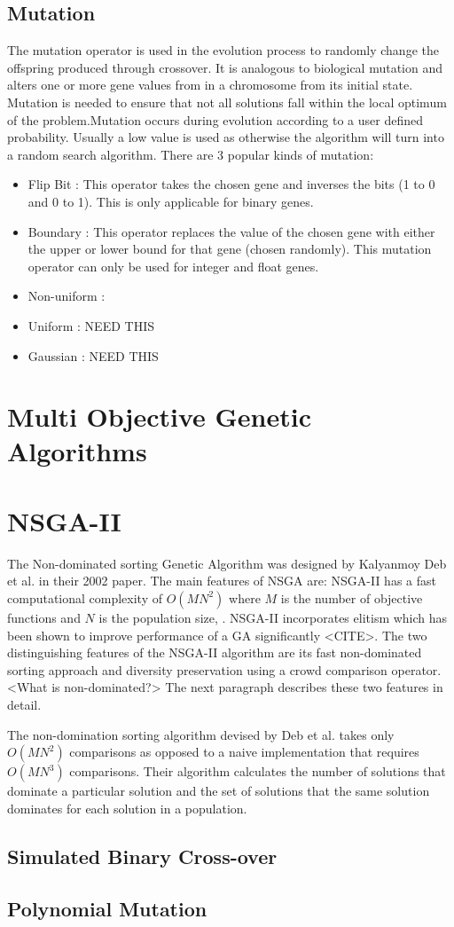 \subsection{Mutation}
The mutation operator is used in the evolution process to randomly change the offspring produced through crossover. It is analogous to biological mutation and alters one or more gene values from in a chromosome from its initial state. Mutation is needed to ensure that not all solutions fall within the local optimum of the problem.Mutation occurs during evolution according to a user defined probability. Usually a low value is used as otherwise the algorithm will turn into a random search algorithm.
There are 3 popular kinds of mutation:

\begin{itemize}
\item Flip Bit : This operator takes the chosen gene and inverses the bits (1 to 0 and 0 to 1). This is only applicable for binary genes.
\item Boundary : This operator replaces the value of the chosen gene with either the upper or lower bound for that gene (chosen randomly). This mutation operator can only be used for integer and float genes.
\item Non-uniform : 
\item Uniform : NEED THIS
\item Gaussian : NEED THIS
\end{itemize}

\section{Multi Objective Genetic Algorithms}
\section{NSGA-II} \label{sec:nsga}
The Non-dominated sorting Genetic Algorithm was designed by Kalyanmoy Deb et al. in their 2002 paper. The main features of NSGA are: NSGA-II has a fast computational complexity of $O(MN^2)$ where $M$ is the number of objective functions and $N$ is the population size, . NSGA-II incorporates elitism which has been shown to improve performance of a GA significantly <CITE>. The two distinguishing features of the NSGA-II algorithm are its fast non-dominated sorting approach and diversity preservation using a crowd comparison operator. <What is non-dominated?> The next paragraph describes these two features in detail.

The non-domination sorting algorithm devised by Deb et al. takes only $O(MN^2)$ comparisons as opposed to a naive implementation that requires $O(MN^3)$ comparisons. Their algorithm calculates the number of solutions that dominate a particular solution and the set of solutions that the same solution dominates for each solution in a population. 

\subsection{Simulated Binary Cross-over}
\subsection{Polynomial Mutation}